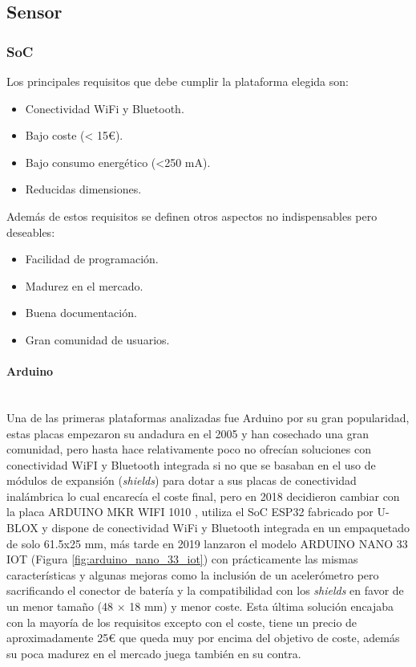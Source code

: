 \documentclass[../proyecto.tex]{subfiles}
\begin{document}
\subsection{Sensor}
\subsubsection{SoC}
Los principales requisitos que debe cumplir la plataforma elegida son:

\begin{itemize}
  \item Conectividad WiFi y Bluetooth.
  \item Bajo coste (< 15€).
  \item Bajo consumo energético (<250 mA).
  \item Reducidas dimensiones.
\end{itemize}

Además de estos requisitos se definen otros aspectos no indispensables pero deseables:

\begin{itemize}
  \item Facilidad de programación.
  \item Madurez en el mercado.
  \item Buena documentación.
  \item Gran comunidad de usuarios.
\end{itemize}

\paragraph{Arduino}\mbox{}\\
Una de las primeras plataformas analizadas fue Arduino por su gran popularidad, estas placas empezaron su andadura en el 2005 y han cosechado una gran comunidad, pero hasta hace relativamente poco no ofrecían soluciones con conectividad WiFI y Bluetooth integrada si no que se basaban en el uso de módulos de expansión (\textit{shields}) para dotar a sus placas de conectividad inalámbrica lo cual encarecía el coste final, pero en 2018 decidieron cambiar con la placa ARDUINO MKR WIFI 1010 \cite{arduino_mkr_wifi_1010}, utiliza el SoC ESP32 fabricado por U-BLOX y dispone de conectividad WiFi y Bluetooth integrada en un empaquetado de solo 61.5x25 mm, más tarde en 2019 lanzaron el modelo ARDUINO NANO 33 IOT \cite{arduino_nano_33_iot} (Figura \ref{fig:arduino_nano_33_iot}) con prácticamente las mismas características y algunas mejoras como la inclusión de un acelerómetro pero sacrificando el conector de batería y la compatibilidad con los \textit{shields} en favor de un menor tamaño (48 × 18 mm) y menor coste. Esta última solución encajaba con la mayoría de los requisitos excepto con el coste, tiene un precio de aproximadamente 25€ que queda muy por encima del objetivo de coste, además su poca madurez en el mercado juega también en su contra.
\end{document}
